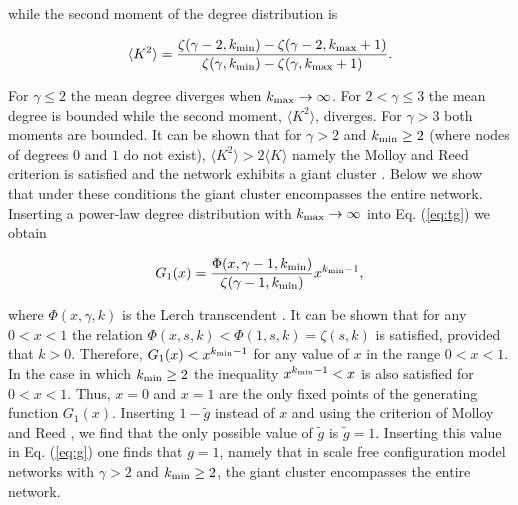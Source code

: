\documentclass[preprint,pre,superscriptaddress,showpacs]{revtex4}
\begin{document}
\noindent
while the second moment of the degree distribution is

\begin{equation}
\langle K^2 \rangle = 
\frac{ \zeta(\gamma-2,k_{\rm min}) - \zeta(\gamma-2,k_{\rm max}+1) }
{ \zeta(\gamma,k_{\rm min}) - \zeta(\gamma,k_{\rm max}+1) }.
\label{eq:K2msf}
\end{equation}

\noindent
For $\gamma \le 2$ the mean degree diverges when 
$k_{\rm max} \rightarrow \infty$.
For $2 < \gamma \le 3$ the mean degree is 
bounded while the second moment,
$\langle K^2 \rangle$, diverges.
For $\gamma > 3$ both moments are bounded.
It can be shown that for $\gamma > 2$ and
$k_{\rm min} \ge 2$ 
(where nodes of degrees $0$ and $1$ do not exist),
$\langle K^2 \rangle > 2 \langle K \rangle$
namely the Molloy and Reed criterion is satisfied
and the network exhibits a giant cluster
\cite{Molloy1995,Molloy1998}. 
Below we show that under these conditions
the giant cluster encompasses the entire network.
Inserting a power-law degree distribution
with $k_{\rm max} \rightarrow \infty$
into Eq. 
(\ref{eq:tg})
we obtain

\begin{equation}
G_1(x) = \frac{\Phi(x,\gamma-1,k_{\rm min})}{\zeta(\gamma-1,k_{\rm min})}
x^{k_{\rm min}-1},
\end{equation}

\noindent
where $\Phi(x,\gamma,k)$
is the Lerch transcendent
\cite{Gradshteyn2000}.
It can be shown that for any $0 < x < 1$ the relation
$\Phi(x,s,k) < \Phi(1,s,k) = \zeta(s,k)$ 
is satisfied,
provided that $k >0$.
Therefore,
$G_1(x) < x^{k_{\rm min}-1}$ 
for any value of $x$ in the range
$0 < x <1$.
In the case in which $k_{\rm min} \ge 2$ the inequality
$x^{k_{\rm min}-1} < x$ is also satisfied for $0 < x < 1$.
Thus, $x=0$ and $x=1$ are the only fixed points 
of the generating function $G_1(x)$.
Inserting $1-\tilde g$ instead of $x$ 
and using the criterion of Molloy and Reed
\cite{Molloy1995,Molloy1998},
we find that the only possible value of
$\tilde g$ is $\tilde g = 1$.
Inserting this value in Eq.
(\ref{eq:g})
one finds that $g=1$,
namely that in scale free configuration model networks
with $\gamma > 2$ and $k_{\rm min} \ge 2$, 
the giant cluster encompasses the entire network.
\end{document}
